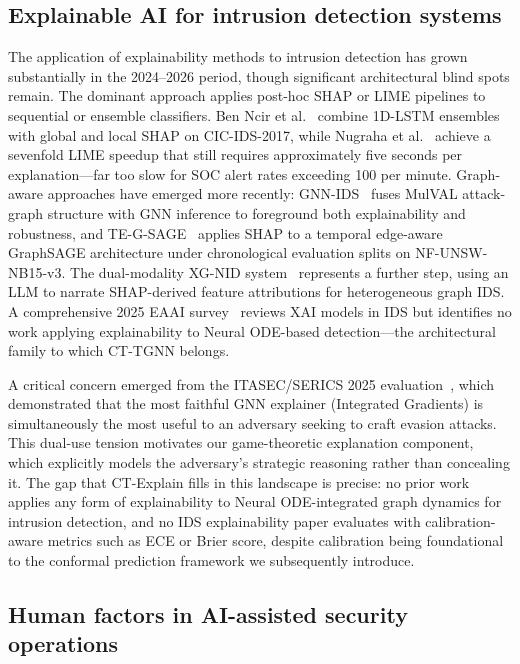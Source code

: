 \documentclass[preprint,review,12pt]{elsarticle}
\begin{document}
\subsection{Explainable AI for intrusion detection systems}

The application of explainability methods to intrusion detection has grown substantially in the 2024--2026 period, though significant architectural blind spots remain. The dominant approach applies post-hoc SHAP or LIME pipelines to sequential or ensemble classifiers. Ben Ncir et al.~\cite{ben_ncir_2024} combine 1D-LSTM ensembles with global and local SHAP on CIC-IDS-2017, while Nugraha et al.~\cite{nugraha_2025} achieve a sevenfold LIME speedup that still requires approximately five seconds per explanation---far too slow for SOC alert rates exceeding 100 per minute. Graph-aware approaches have emerged more recently: GNN-IDS~\cite{gnn_ids_2024} fuses MulVAL attack-graph structure with GNN inference to foreground both explainability and robustness, and TE-G-SAGE~\cite{te_gsage_2025} applies SHAP to a temporal edge-aware GraphSAGE architecture under chronological evaluation splits on NF-UNSW-NB15-v3. The dual-modality XG-NID system~\cite{xg_nid_2024} represents a further step, using an LLM to narrate SHAP-derived feature attributions for heterogeneous graph IDS. A comprehensive 2025 EAAI survey~\cite{eaai_xai_ids_2025} reviews XAI models in IDS but identifies no work applying explainability to Neural ODE-based detection---the architectural family to which CT-TGNN belongs.

A critical concern emerged from the ITASEC/SERICS 2025 evaluation~\cite{itasec_dual_use_2025}, which demonstrated that the most faithful GNN explainer (Integrated Gradients) is simultaneously the most useful to an adversary seeking to craft evasion attacks. This dual-use tension motivates our game-theoretic explanation component, which explicitly models the adversary's strategic reasoning rather than concealing it. The gap that CT-Explain fills in this landscape is precise: no prior work applies any form of explainability to Neural ODE-integrated graph dynamics for intrusion detection, and no IDS explainability paper evaluates with calibration-aware metrics such as ECE or Brier score, despite calibration being foundational to the conformal prediction framework we subsequently introduce.

\subsection{Human factors in AI-assisted security operations}
\end{document}
